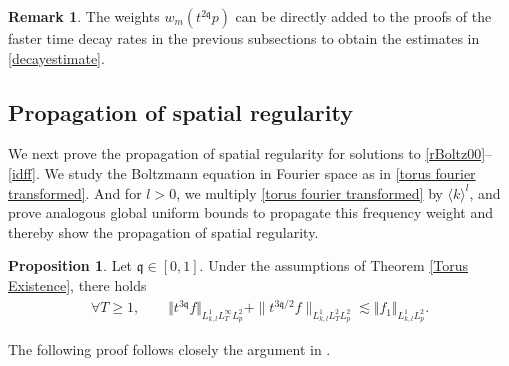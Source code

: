\documentclass[reqno]{amsart}
\newcommand{\pv}{p}
\newcommand{\qq}{\mathfrak{q}}
\newcommand{\tqq}{t^{2\qq}}
\newcommand{\tTq}{t^{3\qq}}
\theoremstyle{definition}
\newtheorem{proposition}[theorem]{Proposition}
\newtheorem{remark}[theorem]{Remark}
\numberwithin{equation}{section}
\numberwithin{theorem}{section}
\begin{document}
\begin{remark}
The weights $w_{m}(\tqq \pv)$ can be directly added to the proofs of the faster time decay rates in the previous subsections to obtain the estimates in \eqref{decayestimate}. 
\end{remark}

\subsection{Propagation of spatial regularity}\label{sec.spatial.regularity.solution}


We next prove the propagation of spatial regularity for solutions to \eqref{rBoltz00}--\eqref{idff}. We study the Boltzmann equation in Fourier space as in \eqref{torus fourier transformed}. And for $l>0$, we multiply \eqref{torus fourier transformed} by $\langle k \rangle^{l}$, and prove analogous global uniform bounds to propagate this frequency weight and thereby show the propagation of spatial regularity. 

\begin{proposition}\label{prop:spatreg}
       Let \(\qq\in [0,1]\). Under the assumptions of Theorem \ref{Torus Existence}, there holds 
\begin{align}\label{weight.propagate}
\forall T\geq 1, \qquad    {\Vert{\tTq f}\Vert_{L^1_{k,l}L^\infty_TL^2_{\pv}}} 
+ 
\|t^{3\qq/2} f\|_{L^1_{k,l}L^2_TL^2_p}
\lesssim 
\Vert  {f}_1\Vert_{L^1_{k,l}L^2_{\pv}}.
\end{align}
\end{proposition}

The following proof follows closely the argument in \cite{1904.12086}.
\end{document}
